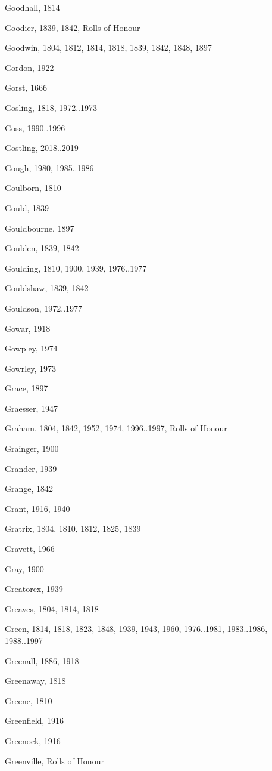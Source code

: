 \begin{theindex}
\item Goodhall, 1814
\item Goodier, 1839, 1842, Rolls of Honour
\item Goodwin, 1804, 1812, 1814, 1818, 1839, 1842, 1848, 1897
\item Gordon, 1922
\item Gorst, 1666
\item Gosling, 1818, 1972..1973
\item Goss, 1990..1996
\item Gostling, 2018..2019
\item Gough, 1980, 1985..1986
\item Goulborn, 1810
\item Gould, 1839
\item Gouldbourne, 1897
\item Goulden, 1839, 1842
\item Goulding, 1810, 1900, 1939, 1976..1977
\item Gouldshaw, 1839, 1842
\item Gouldson, 1972..1977
\item Gowar, 1918
\item Gowpley, 1974
\item Gowrley, 1973
\item Grace, 1897
\item Graesser, 1947
\item Graham, 1804, 1842, 1952, 1974, 1996..1997, Rolls of Honour
\item Grainger, 1900
\item Grander, 1939
\item Grange, 1842
\item Grant, 1916, 1940
\item Gratrix, 1804, 1810, 1812, 1825, 1839
\item Gravett, 1966
\item Gray, 1900
\item Greatorex, 1939
\item Greaves, 1804, 1814, 1818
\item Green, 1814, 1818, 1823, 1848, 1939, 1943, 1960, 1976..1981, 1983..1986, 1988..1997
\item Greenall, 1886, 1918
\item Greenaway, 1818
\item Greene, 1810
\item Greenfield, 1916
\item Greenock, 1916
\item Greenville, Rolls of Honour

\end{theindex}
